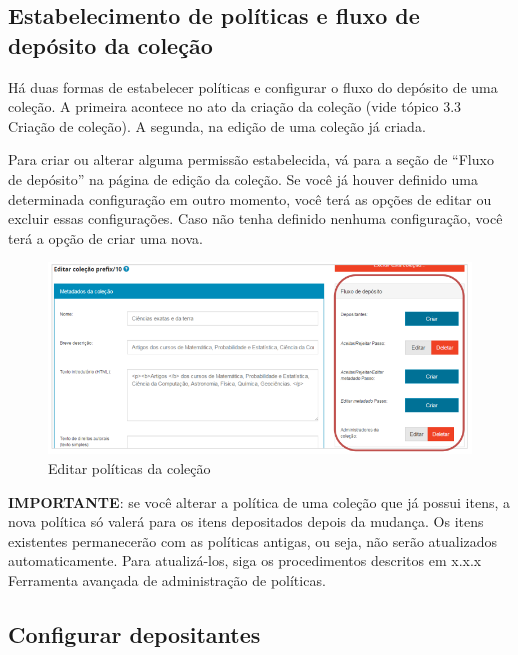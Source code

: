 \documentclass[12pt,hidelinks]{article}
\begin{document}
    \subsection{Estabelecimento de políticas e fluxo de depósito da coleção}
    
    Há duas formas de estabelecer políticas e configurar o fluxo do depósito de uma coleção. A primeira acontece no ato da criação da coleção (vide tópico 3.3 Criação de coleção). A segunda, na edição de uma coleção já criada.
    
    \singlespacing
    
    Para criar ou alterar alguma permissão estabelecida, vá para a seção de “Fluxo de depósito” na página de edição da coleção. Se você já houver definido uma determinada configuração em outro momento, você terá as opções de editar ou excluir essas configurações. Caso não tenha definido nenhuma configuração, você terá a opção de criar uma nova.
    
    \begin{figure}[!htp]
                \centering
                \includegraphics[scale=0.8]{figura/Figura41.png}
                \caption{Editar políticas da coleção}
            \label{Rotulo}
        \end{figure}

\newpage
    
    \textbf{IMPORTANTE}: se você alterar a política de uma coleção que já possui itens, a nova política só valerá para os itens depositados depois da mudança. Os itens existentes permanecerão com as políticas antigas, ou seja, não serão atualizados automaticamente. Para atualizá-los, siga os procedimentos descritos em x.x.x Ferramenta avançada de administração de políticas.
    
    \subsection{Configurar depositantes}
    
\end{document}

